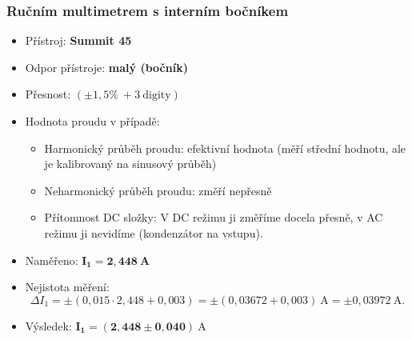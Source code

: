 \documentclass[a4paper,12pt]{article}
\begin{document}
\subsubsection{Ručním multimetrem s interním bočníkem}
\begin{itemize}
  \item Přístroj: \textbf{Summit 45}
  \item Odpor přístroje: \textbf{malý (bočník)}
  \item Přesnost: $(\pm 1,5 \%\ + 3\ \mathrm{digity})$
  \item Hodnota proudu v případě:
    \begin{itemize}
      \item Harmonický průběh proudu: efektivní hodnota (měří střední hodnotu, ale je kalibrovaný na sinusový průběh)
      \item Neharmonický průběh proudu: změří nepřesně
      \item Přítomnost DC složky: V DC režimu ji změříme docela přesně, v AC režimu ji nevidíme (kondenzátor na vstupu).
    \end{itemize}
  \item Naměřeno: $\mathbf{I_1 = 2{,}448\ A}$
  \item Nejistota měření:
  $$
    \Delta I_1 = \pm \left(0{,}015 \cdot 2{,}448 + 0{,}003\right)
    = \pm \left(0{,}03672 + 0{,}003\right)\ \mathrm{A}
    = \pm 0{,}03972\ \mathrm{A}.
  $$
  \item Výsledek: $\mathbf{I_1 = (2{,}448 \pm 0{,}040)\ \mathrm{A}}$
\end{itemize}
\end{document}
